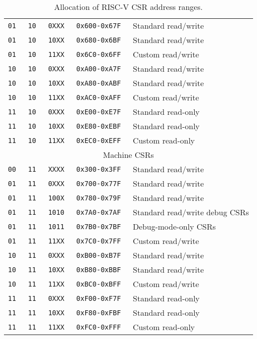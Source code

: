 \begin{table*}[h!]
\begin{center}
\begin{tabular}{|c|c|c|c|l|}
\tt   01   &\tt   10  &\tt   0XXX   & \tt 0x600-0x67F & Standard read/write \\
\tt   01   &\tt   10  &\tt   10XX   & \tt 0x680-0x6BF & Standard read/write \\
\tt   01   &\tt   10  &\tt   11XX   & \tt 0x6C0-0x6FF & Custom read/write \\
\tt   10   &\tt   10  &\tt   0XXX   & \tt 0xA00-0xA7F & Standard read/write \\
\tt   10   &\tt   10  &\tt   10XX   & \tt 0xA80-0xABF & Standard read/write \\
\tt   10   &\tt   10  &\tt   11XX   & \tt 0xAC0-0xAFF & Custom read/write \\
\tt   11   &\tt   10  &\tt   0XXX   & \tt 0xE00-0xE7F & Standard read-only \\
\tt   11   &\tt   10  &\tt   10XX   & \tt 0xE80-0xEBF & Standard read-only \\
\tt   11   &\tt   10  &\tt   11XX   & \tt 0xEC0-0xEFF & Custom read-only \\
\hline
\multicolumn{5}{|c|}{Machine CSRs}  \\
\hline
\tt   00   &\tt   11  &\tt   XXXX   & \tt 0x300-0x3FF & Standard read/write \\
\tt   01   &\tt   11  &\tt   0XXX   & \tt 0x700-0x77F & Standard read/write \\
\tt   01   &\tt   11  &\tt   100X   & \tt 0x780-0x79F & Standard read/write \\
\tt   01   &\tt   11  &\tt   1010   & \tt 0x7A0-0x7AF & Standard read/write debug CSRs  \\
\tt   01   &\tt   11  &\tt   1011   & \tt 0x7B0-0x7BF & Debug-mode-only CSRs \\
\tt   01   &\tt   11  &\tt   11XX   & \tt 0x7C0-0x7FF & Custom read/write \\
\tt   10   &\tt   11  &\tt   0XXX   & \tt 0xB00-0xB7F & Standard read/write \\
\tt   10   &\tt   11  &\tt   10XX   & \tt 0xB80-0xBBF & Standard read/write \\
\tt   10   &\tt   11  &\tt   11XX   & \tt 0xBC0-0xBFF & Custom read/write \\
\tt   11   &\tt   11  &\tt   0XXX   & \tt 0xF00-0xF7F & Standard read-only \\
\tt   11   &\tt   11  &\tt   10XX   & \tt 0xF80-0xFBF & Standard read-only \\
\tt   11   &\tt   11  &\tt   11XX   & \tt 0xFC0-0xFFF & Custom read-only \\
\hline
\end{tabular}
\end{center}
\caption{Allocation of RISC-V CSR address ranges.}
\label{csrrwpriv}
\end{table*}

